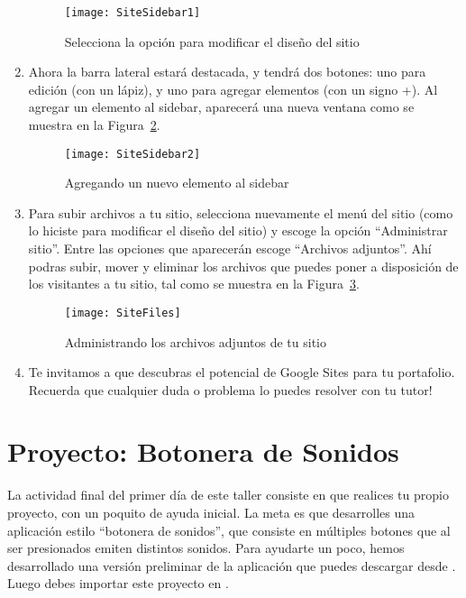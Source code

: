 \begin{enumerate}
  \begin{figure}[H]
    \centering
    \texttt{[image: SiteSidebar1]}
    \caption{Selecciona la opción para modificar el diseño del sitio}
    \label{fig:SiteSidebar1}
  \end{figure}

\item Ahora la barra lateral estará destacada, y tendrá dos botones: uno para edición (con un lápiz), y uno para agregar elementos (con un signo +). Al agregar un elemento al sidebar, aparecerá una nueva ventana como se muestra en la Figura~\ref{fig:SiteSidebar2}.

  \begin{figure}[H]
    \centering
    \texttt{[image: SiteSidebar2]}
    \caption{Agregando un nuevo elemento al sidebar}
    \label{fig:SiteSidebar2}
  \end{figure}

\item Para subir archivos a tu sitio, selecciona nuevamente el menú del sitio (como lo hiciste para modificar el diseño del sitio) y escoge la opción ``Administrar sitio''. Entre las opciones que aparecerán escoge ``Archivos adjuntos''. Ahí podras subir, mover y eliminar los archivos que puedes poner a disposición de los visitantes a tu sitio, tal como se muestra en la Figura~\ref{fig:SiteFiles}.

  \begin{figure}[H]
    \centering
    \texttt{[image: SiteFiles]}
    \caption{Administrando los archivos adjuntos de tu sitio}
    \label{fig:SiteFiles}
  \end{figure}



\item Te invitamos a que descubras el potencial de Google Sites para tu portafolio. Recuerda que cualquier duda o problema lo puedes resolver con tu tutor!

\end{enumerate}

\section{Proyecto: Botonera de Sonidos}
\label{sec:proy-boton-de}

La actividad final del primer día de este taller consiste en que realices tu propio proyecto, con un poquito de ayuda inicial. La meta es que desarrolles una aplicación estilo ``botonera de sonidos'', que consiste en múltiples botones que al ser presionados emiten distintos sonidos. Para ayudarte un poco, hemos desarrollado una versión preliminar de la aplicación que puedes descargar desde . Luego debes importar este proyecto en \AppInventor.

